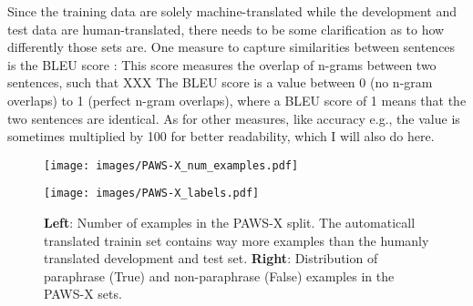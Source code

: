 Since the training data are solely machine-translated while the development and test data are
human-translated, there needs to be some clarification as to how differently those sets are.
One measure to capture similarities between sentences is the BLEU score \cite{papineni2002bleu}:
This score measures the overlap of n-grams between two sentences, such that XXX
The BLEU score is a value between 0 (no n-gram overlaps) to 1 (perfect n-gram overlaps), where a
BLEU score of 1 means that the two sentences are identical. As for other measures, like accuracy
e.g., the value is sometimes multiplied by 100 for better readability, which I will also do here.




\begin{figure}
  \label{fig:pawsx-stat}
  \begin{minipage}{0.45\linewidth}
  \vspace{0pt}
    \texttt{[image: images/PAWS-X\_num\_examples.pdf]}
  \end{minipage}
  \hfill
  \begin{minipage}{0.45\linewidth}
  \vspace{0pt}
    \texttt{[image: images/PAWS-X\_labels.pdf]}
  \end{minipage}
  \caption[PAWS-X Set Size/Labels]{\textbf{Left}: Number of examples in the PAWS-X split. The automaticall translated
                           trainin set contains way more examples than the humanly translated development and test set.
                           \textbf{Right}: Distribution of paraphrase (True) and non-paraphrase (False) examples in the
                           PAWS-X sets.}
\end{figure}



